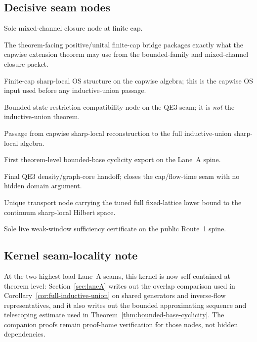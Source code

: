\subsection{Decisive seam nodes}
\begin{description}[leftmargin=2.2em,style=nextline]
\item[Theorem~\ref{thm:mixed-correlator-closure}.] Sole mixed-channel closure node at finite cap.
\item[Companion-II bridge 5.74A.] The theorem-facing positive/unital finite-cap bridge packages exactly what the capwise extension theorem may use from the bounded-family and mixed-channel closure packet.
\item[Theorem~\ref{thm:finite-cap-extension}.] Finite-cap sharp-local OS structure on the capwise algebra; this is the capwise OS input used before any inductive-union passage.
\item[Companion-II Corollary~5.75.] Bounded-state restriction compatibility node on the QE3 seam; it is \emph{not} the inductive-union theorem.
\item[Corollary~\ref{cor:full-inductive-union}.] Passage from capwise sharp-local reconstruction to the full inductive-union sharp-local algebra.
\item[Theorem~\ref{thm:bounded-base-cyclicity}.] First theorem-level bounded-base cyclicity export on the Lane~A spine.
\item[Lemma~\ref{lem:qe3-graph-core}.] Final QE3 density/graph-core handoff; closes the cap/flow-time seam with no hidden domain argument.
\item[Theorem~\ref{thm:continuum-gap-transport}.] Unique transport node carrying the tuned full fixed-lattice lower bound to the continuum sharp-local Hilbert space.
\item[Theorem~\ref{thm:weak-window-certificate}.] Sole live weak-window sufficiency certificate on the public Route~1 spine.
\end{description}

\subsection{Kernel seam-locality note}
At the two highest-load Lane~A seams, this kernel is now self-contained at theorem level: Section~\ref{sec:laneA} writes out the overlap comparison used in Corollary~\ref{cor:full-inductive-union} on shared generators and inverse-flow representatives, and it also writes out the bounded approximating sequence and telescoping estimate used in Theorem~\ref{thm:bounded-base-cyclicity}. The companion proofs remain proof-home verification for those nodes, not hidden dependencies.

